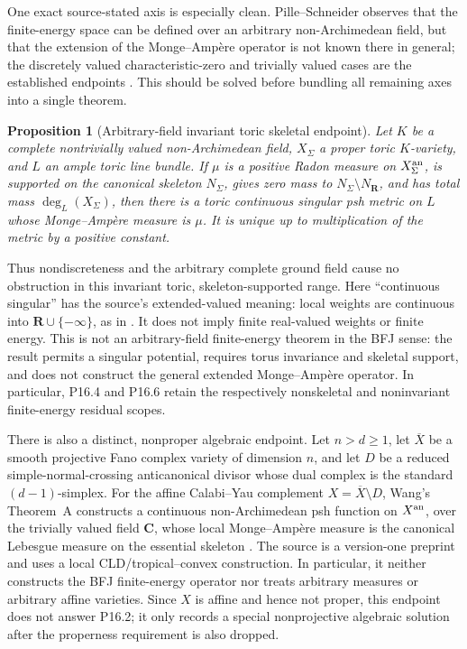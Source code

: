 \documentclass[11pt,a4paper]{article}
\newtheorem{proposition}[proposition]{Proposition}
\theoremstyle{definition}
\theoremstyle{remark}
\begin{document}
One exact source-stated axis is especially clean.  Pille--Schneider observes
that the finite-energy space can be defined over an arbitrary
non-Archimedean field, but that the extension of the Monge--Amp\`ere operator
is not known there in general; the discretely valued characteristic-zero and
trivially valued cases are the established endpoints
\cite[Remark~4.4]{PS23Hybrid}.  This should be solved before bundling all
remaining axes into a single theorem.

\begin{proposition}[Arbitrary-field invariant toric skeletal endpoint]
\label{prop:p164-arbitrary-field-toric-skeletal-endpoint}
Let \(K\) be a complete nontrivially valued non-Archimedean field,
\(X_\Sigma\) a proper toric \(K\)-variety, and \(L\) an ample toric line
bundle.  If \(\mu\) is a positive Radon measure on \(X_\Sigma^{\mathrm{an}}\), is
supported on the canonical skeleton \(N_\Sigma\), gives zero mass to
\(N_\Sigma\setminus N_{\mathbf R}\), and has total mass
\(\deg_L(X_\Sigma)\), then there is a toric continuous singular psh metric
on \(L\) whose Monge--Amp\`ere measure is \(\mu\).  It is unique up to
multiplication of the metric by a positive constant.
\end{proposition}



Thus nondiscreteness and the arbitrary complete ground field cause no
obstruction in this invariant toric, skeleton-supported range.
Here ``continuous singular'' has the source's extended-valued meaning:
local weights are continuous into \(\mathbf R\cup\{-\infty\}\), as in
\cite[\S5.3.1]{BGJKK25}.  It does not imply finite real-valued weights or
finite energy.  This is not an arbitrary-field finite-energy theorem in the
BFJ sense: the result permits
a singular potential, requires torus invariance and skeletal support, and
does not construct the general extended Monge--Amp\`ere operator.  In
particular, P16.4 and P16.6 retain the respectively nonskeletal and
noninvariant finite-energy residual scopes.

There is also a distinct, nonproper algebraic endpoint.  Let \(n>d\geq1\),
let \(\overline X\) be a smooth projective Fano complex variety of dimension
\(n\), and let \(D\) be a reduced simple-normal-crossing anticanonical
divisor whose dual complex is the standard \((d-1)\)-simplex.  For the
affine Calabi--Yau complement \(X=\overline X\setminus D\), Wang's
Theorem~A constructs a continuous non-Archimedean psh function on
\(X^{\mathrm{an}}\), over the trivially valued field \(\mathbf C\), whose local
Monge--Amp\`ere measure is the canonical Lebesgue measure on the essential
skeleton \cite{Wang25NACalabiYau}.  The source is a version-one preprint and
uses a local CLD/tropical--convex construction.  In particular, it neither
constructs the BFJ finite-energy operator nor treats arbitrary measures or
arbitrary affine varieties.  Since \(X\) is affine and hence not proper,
this endpoint does not answer P16.2; it only records a special nonprojective
algebraic solution after the properness requirement is also dropped.
\end{document}

